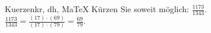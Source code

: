 \begin{MAufgabe}{Kuerzen}{kr, dh, MaTeX}
K\"urzen Sie soweit m\"oglich: $\frac{1173}{1343}$.\\ 
\ifLsg\MLoesung
\quad $\frac{1173}{1343}=\frac{(17)\cdot(69)}{(17)\cdot(79)}=\frac{69}{79}$.\else\relax\fi
 \end{MAufgabe}